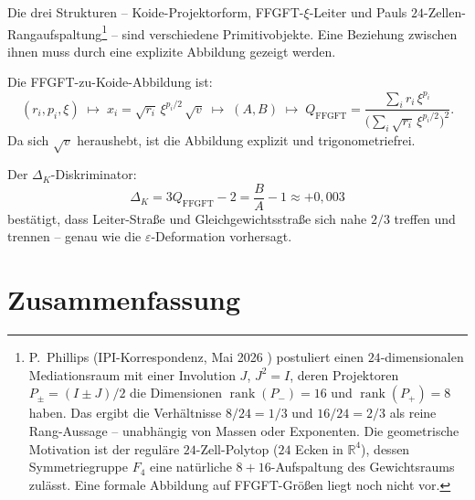 Die drei Strukturen --
Koide-Projektorform, FFGFT-\(\xi\)-Leiter und Pauls \(24\)-Zellen-Rangaufspaltung\footnote{%
P.~Phillips (IPI-Korrespondenz, Mai 2026 \cite{Phillips2026}) postuliert einen
\(24\)-dimensionalen Mediationsraum mit einer Involution \(J\),
\(J^2 = I\), deren Projektoren \(P_\pm = (I \pm J)/2\) die Dimensionen
\(\operatorname{rank}(P_-) = 16\) und \(\operatorname{rank}(P_+) = 8\) haben.
Das ergibt die Verhältnisse \(8/24 = 1/3\) und \(16/24 = 2/3\)
als reine Rang-Aussage -- unabhängig von Massen oder Exponenten.
Die geometrische Motivation ist der reguläre \(24\)-Zell-Polytop (\(24\) Ecken
in \(\mathbb{R}^4\)), dessen Symmetriegruppe \(F_4\) eine natürliche
\(8+16\)-Aufspaltung des Gewichtsraums zulässt.
Eine formale Abbildung auf FFGFT-Größen liegt noch nicht vor.} --
sind verschiedene Primitivobjekte.
Eine Beziehung zwischen ihnen muss durch eine explizite Abbildung gezeigt werden.

Die FFGFT-zu-Koide-Abbildung ist:
\begin{equation}
  (r_i, p_i, \xi)
  \;\longmapsto\;
  x_i = \sqrt{r_i}\,\xi^{p_i/2}\,\sqrt{v}
  \;\longmapsto\;
  (A, B)
  \;\longmapsto\;
  Q_{\text{FFGFT}} = \frac{\sum_i r_i\,\xi^{p_i}}
  {\bigl(\sum_i \sqrt{r_i}\,\xi^{p_i/2}\bigr)^2}.
\end{equation}
Da sich \(\sqrt{v}\) heraushebt, ist die Abbildung explizit und
trigonometriefrei.

Der \(\Delta_K\)-Diskriminator:
\begin{equation}
  \Delta_K = 3Q_{\text{FFGFT}} - 2 = \frac{B}{A} - 1 \approx +0{,}003
\end{equation}
bestätigt, dass Leiter-Straße und Gleichgewichtsstraße sich nahe
\(2/3\) treffen und trennen -- genau wie die \(\varepsilon\)-Deformation vorhersagt.

\section{Zusammenfassung}

